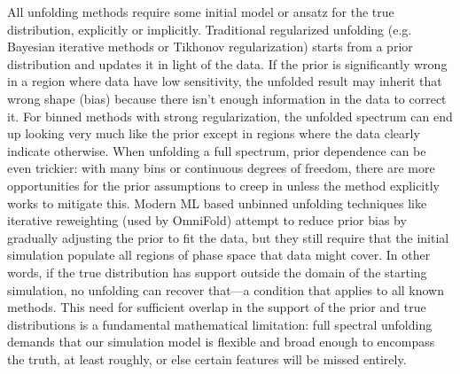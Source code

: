         All unfolding methods require some initial model or ansatz for the true distribution, explicitly or implicitly.
        Traditional regularized unfolding (e.g. Bayesian iterative methods or Tikhonov regularization) starts from a prior distribution and updates it in light of the data.
        If the prior is significantly wrong in a region where data have low sensitivity, the unfolded result may inherit that wrong shape (bias) because there isn’t enough information in the data to correct it.
        For binned methods with strong regularization, the unfolded spectrum can end up looking very much like the prior except in regions where the data clearly indicate otherwise.
        When unfolding a full spectrum, prior dependence can be even trickier: with many bins or continuous degrees of freedom, there are more opportunities for the prior assumptions to creep in unless the method explicitly works to mitigate this.
        Modern ML based unbinned unfolding techniques like iterative reweighting (used by OmniFold) attempt to reduce prior bias by gradually adjusting the prior to fit the data, but they still require that the initial simulation populate all regions of phase space that data might cover.
        In other words, if the true distribution has support outside the domain of the starting simulation, no unfolding can recover that---a condition that applies to all known methods.
        This need for sufficient overlap in the support of the prior and true distributions is a fundamental mathematical limitation: full spectral unfolding demands that our simulation model is flexible and broad enough to encompass the truth, at least roughly, or else certain features will be missed entirely.


